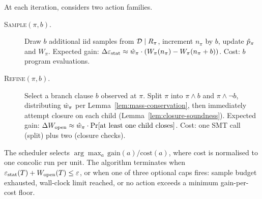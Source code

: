At each iteration, \toolname{} considers two action families.
\begin{description}
\item[\textsc{Sample}$(\pi, b)$.]
  Draw $b$ additional iid samples from $\mathcal{D} \mid R_\pi$, increment
  $n_\pi$ by $b$, update $\hat{p}_\pi$ and $W_\pi$.
  Expected gain: $\Delta\varepsilon_{\mathrm{stat}} \approx \hat{w}_\pi\cdot
  (W_\pi(n_\pi) - W_\pi(n_\pi+b))$.
  Cost: $b$ program evaluations.

\item[\textsc{Refine}$(\pi, b)$.]
  Select a branch clause $b$ observed at $\pi$.  Split $\pi$ into
  $\pi{\wedge}b$ and $\pi{\wedge}\neg b$, distributing $\hat{w}_\pi$
  per Lemma~\ref{lem:mass-conservation}, then immediately attempt
  closure on each child (Lemma~\ref{lem:closure-soundness}).
  Expected gain: $\Delta W_{\mathrm{open}} \approx \hat{w}_\pi \cdot
  \Pr[\text{at least one child closes}]$.
  Cost: one SMT call (split) plus two (closure checks).
\end{description}

The scheduler selects $\arg\max_a\,\mathrm{gain}(a)/\mathrm{cost}(a)$,
where cost is normalised to one concolic run per unit.  The algorithm
terminates when $\varepsilon_{\mathrm{stat}}(T) + W_{\mathrm{open}}(T) \le \varepsilon$, or when
one of three optional caps fires: sample budget exhausted, wall-clock
limit reached, or no action exceeds a minimum gain-per-cost floor.

